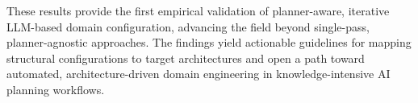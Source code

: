 \documentclass[
  numbers=noenddot,
  english,  %
  a4paper,  %
  oneside,  %
  bibliography=totoc,
  headsepline,
  cleardoublepage=empty,
  parskip=half,
  draft=false
]{scrbook}
\theoremstyle{break}
\begin{document}
These results provide the first empirical validation of planner-aware, iterative LLM-based domain configuration, advancing the field beyond single-pass, planner-agnostic approaches. The findings yield actionable guidelines for mapping structural configurations to target architectures and open a path toward automated, architecture-driven domain engineering in knowledge-intensive AI planning workflows.


%
%
\setcounter{tocdepth}{1}
\tableofcontents

\listoffigures

\listoftables

\lstlistoflistings


\begingroup
\renewcommand*{\pagelistname}{Page}
\renewcommand*{\arraystretch}{1.4}
\printglossary[type=\acronymtype,title={Abbreviations}]
\endgroup


\renewcommand*{\chapterpagestyle}{scrplain}
\pagestyle{scrheadings}










\end{document}
